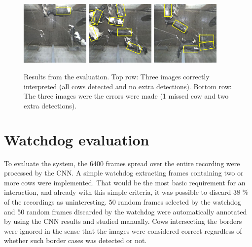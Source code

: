 \documentclass[10pt,a4paper,twocolumn]{article}
\begin{document}
\begin{figure}[tb]
\begin{center}
  \includegraphics[width=0.3\textwidth]{bad/1419743355933936.jpg}
  \includegraphics[width=0.3\textwidth]{bad/1420050868326145.jpg}
  \includegraphics[width=0.3\textwidth]{bad/1420185482574217.jpg}
\end{center}
  \caption{Results from the evaluation. Top row: Three images correctly interpreted (all cows detected and no extra detections). Bottom row: The three images were the errors were made (1 missed cow and two extra detections).}
  \label{fig:res}
\end{figure}

\section{Watchdog evaluation}

To evaluate the system, the 6400 frames spread over the entire recording were processed by the CNN. A simple watchdog extracting frames containing two or more cows were implemented. That would be the most basic requirement for an interaction, and already with this simple criteria, it was possible to discard 38 \% of the recordings as uninteresting. 50 random frames selected by the watchdog and 50 random frames discarded by the watchdog were automatically annotated by using the CNN results and studied manually. Cows intersecting the borders were ignored in the sense that the images were considered correct regardless of whether such border cases was detected or not.
\end{document}
